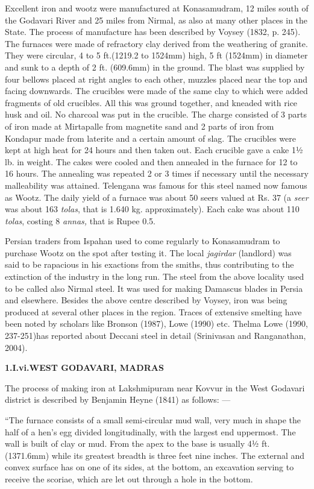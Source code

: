 Excellent iron and wootz were manufactured at Konasamudram, 12 miles south of the Godavari River and 25 miles from Nirmal, as also at many other places in the State. The process of manufacture has been described by Voysey (1832, p. 245). The furnaces were made of refractory clay derived from the weathering of granite. They were circular, 4 to 5 ft.(1219.2 to 1524mm) high, 5 ft (1524mm) in diameter and sunk to a depth of 2 ft. (609.6mm) in the ground. The blast was supplied by four bellows placed at right angles to each other, muzzles placed near the top and facing downwards. The crucibles were made of the same clay to which were added fragments of old crucibles. All this was ground together, and kneaded with rice husk and oil. No charcoal was put in the crucible. The charge consisted of 3 parts of iron made at Mirtapalle from magnetite sand and 2 parts of iron from Kondapur made from laterite and a certain amount of slag. The crucibles were kept at high heat for 24 hours and then taken out. Each crucible gave a cake 1½ lb. in weight. The cakes were cooled and then annealed in the furnace for 12 to 16 hours. The annealing was repeated 2 or 3 times if necessary until the necessary malleability was attained. Telengana was famous for this steel named now famous as Wootz. The daily yield of a furnace was about 50 seers valued at Rs. 37 (a \textit{seer }was about 163 \textit{tolas}, that is 1.640 kg. approximately). Each cake was about 110 \textit{tolas}, costing 8 \textit{annas, }that is Rupee 0.5.

Persian traders from Ispahan used to come regularly to Konasamudram to purchase Wootz on the spot after testing it. The local \textit{jagirdar} (landlord) was said to be rapacious in his exactions from the smiths, thus contributing to the extinction of the industry in the long run. The steel from the above locality used to be called also Nirmal steel. It was used for making Damascus blades in Persia and elsewhere. Besides the above centre described by Voysey, iron was being produced at several other places in the region. Traces of extensive smelting have been noted by scholars like Bronson (1987), Lowe (1990) etc. Thelma Lowe (1990, 237-251)has reported about Deccani steel in detail (Srinivasan and Ranganathan, 2004).

\textbf{1.I.vi.}\textbf{WEST GODAVARI, MADRAS}

The process of making iron at Lakshmipuram near Kovvur in the West Godavari district is described by Benjamin Heyne (1841) as follows: —

“The furnace consists of a small semi-circular mud wall, very much in shape the half of a hen’s egg divided longitudinally, with the largest end uppermost. The wall is built of clay or mud. From the apex to the base is usually 4½ ft. (1371.6mm) while its greatest breadth is three feet nine inches. The external and convex surface has on one of its sides, at the bottom, an excavation serving to receive the scoriae, which are let out through a hole in the bottom.

